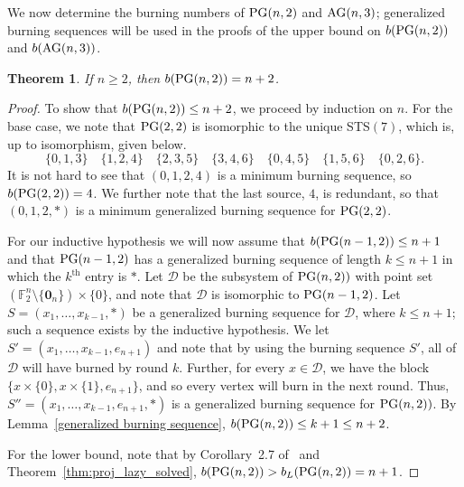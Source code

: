 \documentclass[12pt]{article}
\DeclareMathOperator{\PG}{\rm PG}
\DeclareMathOperator{\AG}{\rm AG}
\newtheorem{theorem}{Theorem}[section]
\theoremstyle{definition}
\numberwithin{table}{section}
\begin{document}
We now determine the burning numbers of $\PG(n,2)$ and $\AG(n,3)$; generalized burning sequences will be used in the proofs of the upper bound on $b(\PG(n,2))$ and $b(\AG(n,3))$.  

\begin{theorem}
\label{cor:proj_regular_burning_solved}
If $n \geq 2$, then $b(\PG(n,2))=n+2$.
\end{theorem}
\begin{proof}
    To show that $b(\PG(n,2)) \leq n+2$, we proceed by induction on $n$.
    For the base case, we note that $\PG(2,2)$ is isomorphic to the unique STS$(7)$, which is, up to isomorphism, given below.
    \[
    \{0,1,3\}\quad \{1,2,4\}\quad \{2,3,5\}\quad \{3,4,6\}\quad \{0,4,5\}\quad \{1,5,6\} \quad\{0,2,6\}.
    \]
    It is not hard to see that $(0, 1, 2, 4)$ is a minimum burning sequence, so $b(\PG(2,2))=4$.
    We further note that the last source, $4$, is redundant, so that $(0,1,2,*)$ is a minimum generalized burning sequence for $\PG(2,2)$.
		
    For our inductive hypothesis we will now assume that $b(\PG(n-1,2)) \leq n+1$ and that $\PG(n-1,2)$ has a generalized burning sequence of length $k \leq n+1$ in which the $k^{\mathrm{th}}$ entry is $*$. 
    Let $\mathcal{D}$ be the subsystem of $\PG(n,2))$ with point set $(\mathbb{F}_2^{n} \setminus \{\mathbf{0}_n\})\times \{0\}$, and note that $\mathcal{D}$ is isomorphic to $\PG(n-1,2)$. Let $S=(x_1,\ldots,x_{k-1},*)$ be a generalized burning sequence for $\mathcal{D}$, where $k \leq n+1$; such a sequence exists by the inductive hypothesis.
    We let $S' = (x_1,\ldots,x_{k-1}, e_{n+1})$ and note that by using the burning sequence $S'$, all of $\mathcal{D}$ will have burned by round $k$. Further, for every $x\in\mathcal{D}$, we have the block $\{x\times \{0\}, x\times \{1\}, e_{n+1}\}$, and so every vertex will burn in the next round. Thus, $S''=(x_1,\ldots,x_{k-1},e_{n+1},*)$ is a generalized burning sequence for $\PG(n,2))$.  By Lemma~\ref{generalized burning sequence}, $b(\PG(n,2)) \leq k+1 \leq n+2$.  

For the lower bound, note that by Corollary~2.7 of~\cite{introducing_hyp_burn} and Theorem~\ref{thm:proj_lazy_solved}, $b(\PG(n,2)) > b_L(\PG(n,2))=n+1$.
\end{proof}
\end{document}
